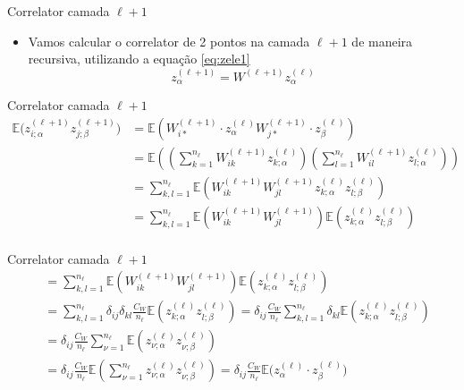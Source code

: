 \documentclass{beamer}
\newcommand{\EE}{\mathbb{E}}
\newcommand{\aaA}{\alpha}
\newcommand{\aaB}{\beta}
\begin{document}
\begin{frame}{Correlator camada $\ell+1$}
	\begin{itemize}
		\item Vamos calcular o correlator de 2 pontos na camada $\ell+1$ de maneira recursiva, utilizando a equação \eqref{eq:zele1}
		\begin{equation*}\tag{3.2'}
			z^{(\ell+1)}_{\alpha} = W^{(\ell+1)} z^{(\ell)}_\alpha
		\end{equation*}
	\end{itemize}
\end{frame}

\begin{frame}{Correlator camada $\ell + 1$}
	\begin{align*}
		\EE\big(z^{(\ell +1)}_{i;\aaA} z^{(\ell +1)}_{j;\aaB}\big) &= 
		\EE\left(W^{(\ell+1)}_{i*}\cdot z^{(\ell)}_{\aaA}W^{(\ell+1)}_{j*}\cdot z^{(\ell)}_{\aaB} \right)  \\
		&=\EE\left( \left(\sum_{k=1}^{n_\ell} W^{(\ell +1)}_{ik}z^{(\ell)}_{k;\aaA}\right)
		\left(\sum_{l=1}^{n_\ell} W^{(\ell +1)}_{il}z^{(\ell)}_{l;\aaA}\right) \right)\\
		&=\sum_{k,l=1}^{n_\ell} \EE\left(W^{(\ell+1)}_{ik}W^{(\ell+1)}_{jl}z^{(\ell)}_{k;\aaA}z^{(\ell)}_{l;\aaB} \right)\\
		&=\sum_{k,l=1}^{n_\ell} \EE\left(W^{(\ell+1)}_{ik}W^{(\ell+1)}_{jl}\right) \EE\left(z^{(\ell)}_{k;\aaA}z^{(\ell)}_{l;\aaB} \right)\\
	\end{align*}
\end{frame}

\begin{frame}{Correlator camada $\ell+1$}
	\begin{align*}
		&=\sum_{k,l=1}^{n_\ell} \EE\left(W^{(\ell+1)}_{ik}W^{(\ell+1)}_{jl}\right) \EE\left(z^{(\ell)}_{k;\aaA}z^{(\ell)}_{l;\aaB} \right)\\
		&=\sum_{k,l=1}^{n_\ell} \delta_{ij}\delta_{kl}\frac{C_W}{n_\ell} \EE\left(z^{(\ell)}_{k;\aaA}z^{(\ell)}_{l;\aaB} \right) 
		=\delta_{ij}\frac{C_W}{n_\ell}\sum_{k,l=1}^{n_\ell} \delta_{kl} \EE\left(z^{(\ell)}_{k;\aaA}z^{(\ell)}_{l;\aaB} \right) \\
		&= \delta_{ij}\frac{C_W}{n_\ell} \sum_{\nu=1}^{n_\ell} \EE\left(z^{(\ell)}_{\nu;\aaA}z^{(\ell)}_{\nu;\aaB} \right) \\
		&= \delta_{ij}\frac{C_W}{n_\ell}\EE\left( \sum_{\nu=1}^{n_\ell}z^{(\ell)}_{\nu;\aaA}z^{(\ell)}_{\nu;\aaB} \right) 
		= \delta_{ij}\frac{C_W}{n_\ell} \EE\big(z^{(\ell)}_{\aaA}\cdot  z^{(\ell)}_{\aaB}\big)\tag{3.11}\label{eq:correlatorGl}
	\end{align*}
\end{frame}
	 
\end{document}
